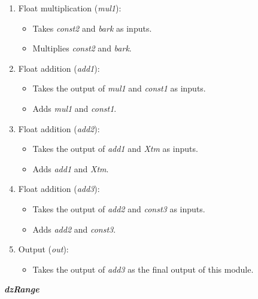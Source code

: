 \begin{enumerate}

\item Float multiplication (\textit{mul1}):
\begin{itemize}
\item Takes \textit{const2} and \textit{bark} as inputs.
\item Multiplies \textit{const2} and \textit{bark}.
\end{itemize}

\item Float addition (\textit{add1}):
\begin{itemize}
\item Takes the output of \textit{mul1} and \textit{const1} as inputs.
\item Adds \textit{mul1} and \textit{const1}.
\end{itemize}

\item Float addition (\textit{add2}):
\begin{itemize}
\item Takes the output of \textit{add1} and \textit{Xtm} as inputs.
\item Adds \textit{add1} and \textit{Xtm}.
\end{itemize}

\item Float addition (\textit{add3}):
\begin{itemize}
\item Takes the output of \textit{add2} and \textit{const3} as inputs.
\item Adds \textit{add2} and \textit{const3}.
\end{itemize}

\item Output (\textit{out}):
\begin{itemize}
\item Takes the output of \textit{add3} as the final output of this module.
\end{itemize}

\end{enumerate}

\vspace{0.5cm}

\textit{\textbf{dzRange}}

